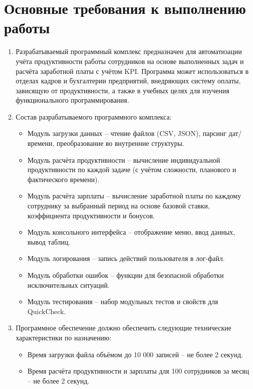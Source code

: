 \documentclass[a4paper, 14pt]{extarticle} %
\begin{document}
    \section{Основные требования к выполнению работы}
        \begin{enumerate}[label=\alph*.]
            \item Разрабатываемый программный комплекс предназначен для автоматизации учёта продуктивности работы сотрудников на основе выполненных задач и расчёта заработной платы с учётом KPI. Программа может использоваться в отделах кадров и бухгалтерии предприятий, внедряющих систему оплаты, зависящую от продуктивности, а также в учебных целях для изучения функционального программирования.
            \item Состав разрабатываемого программного комплекса: 
                \begin{itemize}
                    \item Модуль загрузки данных – чтение файлов (CSV, JSON), парсинг дат/времени, преобразование во внутренние структуры.
                    \item Модуль расчёта продуктивности – вычисление индивидуальной продуктивности по каждой задаче (с учётом сложности, планового и фактического времени).
                    \item Модуль расчёта зарплаты – вычисление заработной платы по каждому сотруднику за выбранный период на основе базовой ставки, коэффициента продуктивности и бонусов.
                    \item Модуль консольного интерфейса – отображение меню, ввод данных, вывод таблиц.
                    \item Модуль логирования – запись действий пользователя в лог-файл.
                    \item Модуль обработки ошибок – функции для безопасной обработки исключительных ситуаций.
                    \item Модуль тестирования – набор модульных тестов и свойств для QuickCheck.
                \end{itemize}
            \item Программное обеспечение должно обеспечить следующие технические характеристики по назначению: 
                \begin{itemize}
                    \item Время загрузки файла объёмом до 10 000 записей – не более 2 секунд.
                    \item Время расчёта продуктивности и зарплаты для 100 сотрудников за месяц – не более 2 секунд.

\end{itemize}
\end{enumerate}
\end{document}
